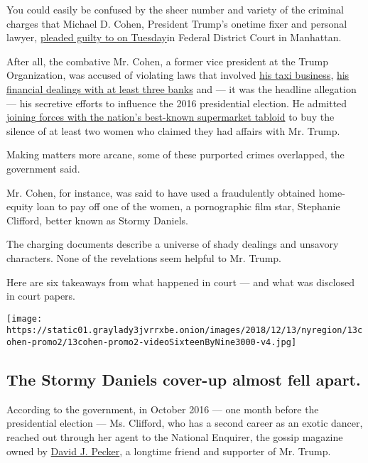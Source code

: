 You could easily be confused by the sheer number and variety of the
criminal charges that Michael D. Cohen, President Trump's onetime fixer
and personal lawyer,
\href{https://www.nytimes3xbfgragh.onion/2018/08/21/nyregion/michael-cohen-plea-deal-trump.html}{pleaded
guilty to on Tuesday}in Federal District Court in Manhattan.

After all, the combative Mr. Cohen, a former vice president at the Trump
Organization, was accused of violating laws that involved
\href{https://www.nytimes3xbfgragh.onion/2018/05/05/business/michael-cohen-lawyer-trump.html}{his
taxi business},
\href{https://www.nytimes3xbfgragh.onion/2018/08/19/nyregion/michael-cohen-loans-donald-trump.html}{his
financial dealings with at least three banks} and --- it was the
headline allegation --- his secretive efforts to influence the 2016
presidential election. He admitted
\href{https://www.nytimes3xbfgragh.onion/2018/04/11/us/politics/trump-national-enquirer-american-media.html}{joining
forces with the nation's best-known supermarket tabloid} to buy the
silence of at least two women who claimed they had affairs with Mr.
Trump.

Making matters more arcane, some of these purported crimes overlapped,
the government said.

Mr. Cohen, for instance, was said to have used a fraudulently obtained
home-equity loan to pay off one of the women, a pornographic film star,
Stephanie Clifford, better known as Stormy Daniels.

The charging documents describe a universe of shady dealings and
unsavory characters. None of the revelations seem helpful to Mr. Trump.

Here are six takeaways from what happened in court --- and what was
disclosed in court papers.

\texttt{[image: https://static01.graylady3jvrrxbe.onion/images/2018/12/13/nyregion/13cohen-promo2/13cohen-promo2-videoSixteenByNine3000-v4.jpg]}

\hypertarget{the-stormy-daniels-cover-up-almost-fell-apart}{%
\subsection{The Stormy Daniels cover-up almost fell
apart.}\label{the-stormy-daniels-cover-up-almost-fell-apart}}

According to the government, in October 2016 --- one month before the
presidential election --- Ms. Clifford, who has a second career as an
exotic dancer, reached out through her agent to the National Enquirer,
the gossip magazine owned by
\href{https://www.nytimes3xbfgragh.onion/2018/03/29/us/politics/trump-national-enquirer-david-pecker.html}{David
J. Pecker}, a longtime friend and supporter of Mr. Trump.

